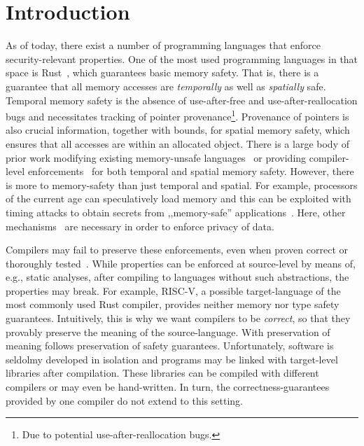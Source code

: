

\section{Introduction}\label{sec:introduction}

  As of today, there exist a number of programming languages that enforce security-relevant properties.
  One of the most used programming languages in that space is Rust~\cite{}, which guarantees basic memory safety.
  That is, there is a guarantee that all memory accesses are {\em temporally} as well as {\em spatially} safe. 
  Temporal memory safety is the absence of use-after-free and use-after-reallocation bugs and necessitates tracking of pointer provenance\footnote{Due to potential use-after-reallocation bugs.}.
  Provenance of pointers is also crucial information, together with bounds, for spatial memory safety, which ensures that all accesses are within an allocated object.
  There is a large body of prior work modifying existing memory-unsafe languages~\cite{} or providing compiler-level enforcements~\cite{} for both temporal and spatial memory safety.
  However, there is more to memory-safety than just temporal and spatial.
  For example, processors of the current age can speculatively load memory and this can be exploited with timing attacks to obtain secrets from ,,memory-safe'' applications~\cite{}.
  Here, other mechanisms~\cite{} are necessary in order to enforce privacy of data.

  Compilers may fail to preserve these enforcements, even when proven correct or thoroughly tested~\cite{}.
  While properties can be enforced at source-level by means of, e.g., static analyses, after compiling to languages without such abstractions, the properties may break.
  For example, RISC-V, a possible target-language of the most commonly used Rust compiler, provides neither memory nor type safety guarantees.
  Intuitively, this is why we want compilers to be {\em correct}, so that they provably preserve the meaning of the source-language.
  With preservation of meaning follows preservation of safety guarantees.
  Unfortunately, software is seldolmy developed in isolation and programs may be linked with target-level libraries after compilation.
  These libraries can be compiled with different compilers or may even be hand-written.
  In turn, the correctness-guarantees provided by one compiler do not extend to this setting.


